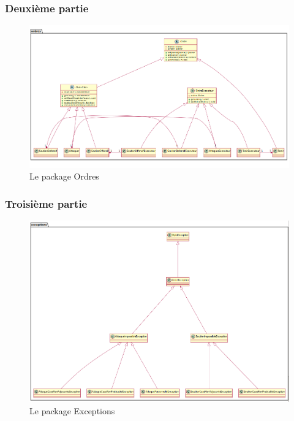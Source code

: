 		\newpage

		\subsubsection{Deuxième partie}
			\vspace{10mm}
			\begin{figure}[!h]
				\centering
				\includegraphics[scale=0.4]{images/DP2.png}
				\caption{Le package Ordres}
			\end{figure}

		\subsubsection{Troisième partie}
			\vspace{10mm}
			\begin{figure}[!h]
				\centering
				\includegraphics[scale=0.4]{images/DP3.png}
				\caption{Le package Exceptions}
			\end{figure}
		\newpage
